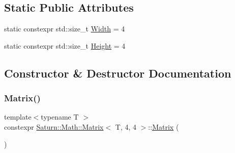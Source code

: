 \subsection*{Static Public Attributes}
\begin{DoxyCompactItemize}
\item 
static constexpr std\+::size\+\_\+t \mbox{\hyperlink{class_saturn_1_1_math_1_1_matrix_3_01_t_00_014_00_014_01_4_ae0e3e5c9ab2d8f43d74ef1485f2a46aa}{Width}} = 4
\item 
static constexpr std\+::size\+\_\+t \mbox{\hyperlink{class_saturn_1_1_math_1_1_matrix_3_01_t_00_014_00_014_01_4_a53f3e480546936c7c9d0fa0a6f8d8bda}{Height}} = 4
\end{DoxyCompactItemize}


\subsection{Constructor \& Destructor Documentation}
\mbox{\label{class_saturn_1_1_math_1_1_matrix_3_01_t_00_014_00_014_01_4_aedf9012c4de47120d50e4cdb58659989}} 
\subsubsection{\texorpdfstring{Matrix()}{Matrix()}\hspace{0.1cm}{\footnotesize\ttfamily [1/4]}}
{\footnotesize\ttfamily template$<$typename T $>$ \\
constexpr \mbox{\hyperlink{class_saturn_1_1_math_1_1_matrix}{Saturn\+::\+Math\+::\+Matrix}}$<$ T, 4, 4 $>$\+::\mbox{\hyperlink{class_saturn_1_1_math_1_1_matrix}{Matrix}} (\begin{DoxyParamCaption}{ }\end{DoxyParamCaption})\hspace{0.3cm}{\ttfamily [inline]}}

\mbox{\label{class_saturn_1_1_math_1_1_matrix_3_01_t_00_014_00_014_01_4_a3264fde5771e874754dda5831ea1fa64}} 
